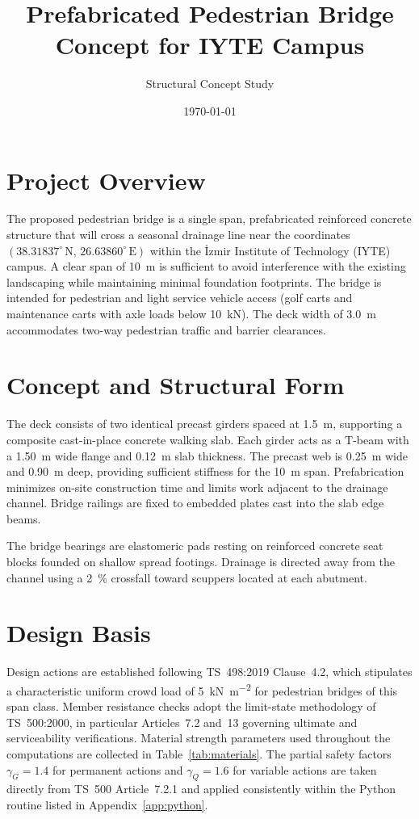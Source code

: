 \documentclass[12pt,a4paper]{report}
\title{Prefabricated Pedestrian Bridge Concept for IYTE Campus}
\author{Structural Concept Study}
\date{\today}
\begin{document}
\maketitle

\section{Project Overview}
The proposed pedestrian bridge is a single span, prefabricated reinforced concrete structure that will cross a seasonal drainage line near the coordinates $(38.31837^{\circ}\,\mathrm{N},\,26.63860^{\circ}\,\mathrm{E})$ within the İzmir Institute of Technology (IYTE) campus. A clear span of \SI{10}{\meter} is sufficient to avoid interference with the existing landscaping while maintaining minimal foundation footprints. The bridge is intended for pedestrian and light service vehicle access (golf carts and maintenance carts with axle loads below \SI{10}{\kilo\newton}). The deck width of \SI{3.0}{\meter} accommodates two-way pedestrian traffic and barrier clearances.

\section{Concept and Structural Form}
The deck consists of two identical precast girders spaced at \SI{1.5}{\meter}, supporting a composite cast-in-place concrete walking slab. Each girder acts as a T-beam with a \SI{1.50}{\meter} wide flange and \SI{0.12}{\meter} slab thickness. The precast web is \SI{0.25}{\meter} wide and \SI{0.90}{\meter} deep, providing sufficient stiffness for the \SI{10}{\meter} span. Prefabrication minimizes on-site construction time and limits work adjacent to the drainage channel. Bridge railings are fixed to embedded plates cast into the slab edge beams.

The bridge bearings are elastomeric pads resting on reinforced concrete seat blocks founded on shallow spread footings. Drainage is directed away from the channel using a \SI{2}{\percent} crossfall toward scuppers located at each abutment.

\section{Design Basis}
Design actions are established following TS~498:2019 Clause~4.2, which stipulates a characteristic uniform crowd load of \SI{5}{\kilo\newton\per\square\meter} for pedestrian bridges of this span class. Member resistance checks adopt the limit-state methodology of TS~500:2000, in particular Articles~7.2 and~13 governing ultimate and serviceability verifications. Material strength parameters used throughout the computations are collected in Table~\ref{tab:materials}. The partial safety factors $\gamma_G = 1.4$ for permanent actions and $\gamma_Q = 1.6$ for variable actions are taken directly from TS~500 Article~7.2.1 and applied consistently within the Python routine listed in Appendix~\ref{app:python}.
\end{document}

